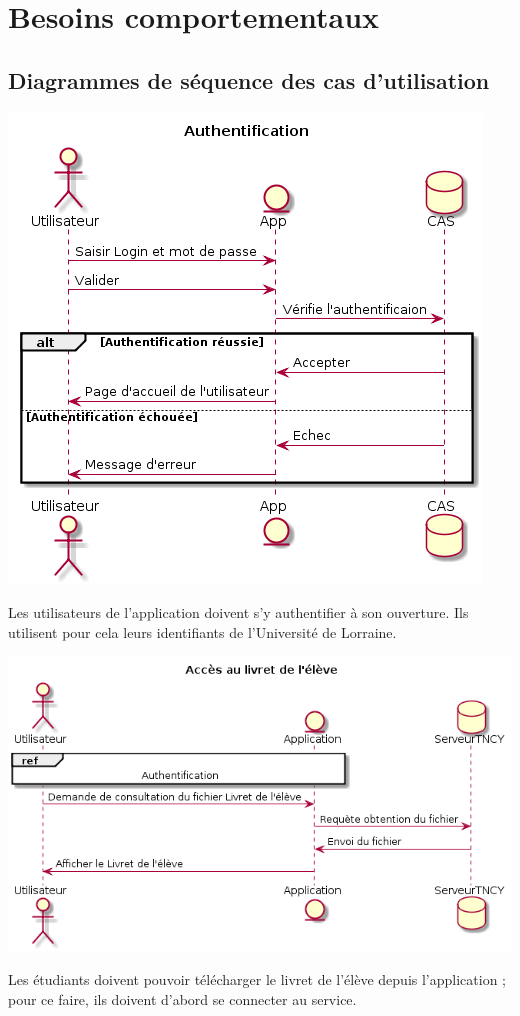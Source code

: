\documentclass{scrreprt}
\begin{document}
\section{Besoins comportementaux}

\subsection{Diagrammes de séquence des cas d'utilisation}
\begin{center}
	\includegraphics[scale=0.55]{image/authentification.png}
\end{center}
\hspace{1cm}Les utilisateurs de l'application doivent s'y authentifier à son ouverture. Ils utilisent pour cela leurs identifiants de l'Université de Lorraine.

\begin{center}
	\includegraphics[scale=0.55]{image/accesLivretEleve.png}
\end{center}
\hspace{1cm}Les étudiants doivent pouvoir télécharger le livret de l'élève depuis l'application ; pour ce faire, ils doivent d'abord se connecter au service.
\end{document}
